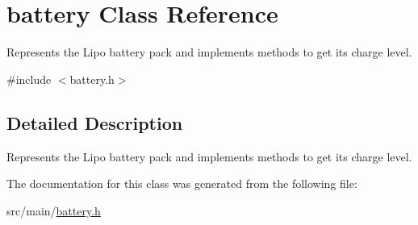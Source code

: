 \hypertarget{classbattery}{}\section{battery Class Reference}
\label{classbattery}


Represents the Lipo battery pack and implements methods to get its charge level.  




{\ttfamily \#include $<$battery.\+h$>$}



\subsection{Detailed Description}
Represents the Lipo battery pack and implements methods to get its charge level. 

The documentation for this class was generated from the following file\+:\begin{DoxyCompactItemize}
\item 
src/main/\hyperlink{battery_8h}{battery.\+h}\end{DoxyCompactItemize}
